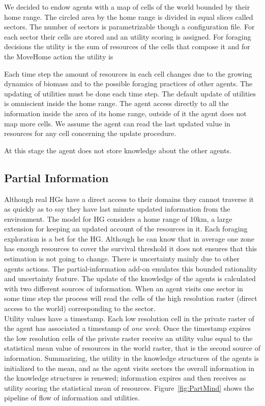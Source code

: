 \documentclass[11pt,oneside,a4paper,openright]{report}
\begin{document}
We decided to endow agents with a map of cells of the world bounded by their home range. The circled area by the home range is divided in equal slices called sectors. The number of sectors is parametrizable though a configuration file.   
For each sector their cells are stored and an utility scoring is assigned. For foraging decisions the utility is the sum of resources of the cells that compose it and for the MoveHome action the utility is %

Each time step the amount of resources in each cell changes due to the growing dynamics of biomass and to the possible foraging practices of other agents. The updating of utilities must be done each time step. The default update of utilities is omniscient inside the home range. The agent access directly to all the information inside the area of its home range, outside of it the agent does not map more cells. We assume the agent can read the last updated value in resources for any cell concerning the update procedure. 

At this stage the agent does not store knowledge about the other agents.

\subsection{Partial Information}
\label{sec:PartialInformation}

Although real HGs have a direct access to their domains they cannot traverse it as quickly as to say they have last minute updated information from the environment. The model for HG considers a home range of 10km, a large extension for keeping an updated account of the resources in it. Each foraging exploration is a bet for the HG. Although he can know that in average one zone has enough resources to cover the survival threshold it does not ensures that this estimation is not going to change. There is uncertainty mainly due to other agents actions. The partial-information add-on emulates this bounded rationality and uncertainty feature. The update of the knowledge of the agents is calculated with two different sources of information. When an agent visits one sector in some time step the process will read the cells of the high resolution raster (direct access to the world) corresponding to the sector.\\
Utility values have a timestamp. Each low resolution cell in the private raster of the agent has associated a timestamp of \emph{one week}. Once the timestamp expires the low resolution cells of the private raster receive an utility value equal to the statistical mean value of resources in the world raster, that is the second source of information. 
Summarizing, the utility in the knowledge structures of the agents is initialized to the mean, and as the agent visits sectors the overall information in the knowledge structures is renewed; information expires and then receives as utility scoring the statistical mean of resources. 
Figure~\ref{fig:PartMind} shows the pipeline of flow of information and utilities.
\end{document}
